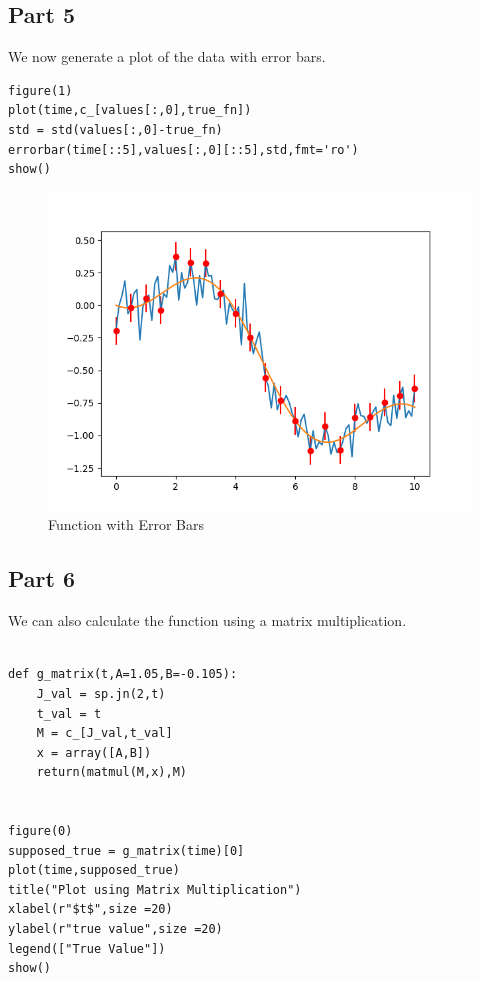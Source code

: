 \documentclass[11pt, a4paper]{article}
\begin{document}
  
 \subsection{Part 5}
 We now generate a plot of the data with error bars.
 \begin{verbatim}
figure(1)
plot(time,c_[values[:,0],true_fn])
std = std(values[:,0]-true_fn)
errorbar(time[::5],values[:,0][::5],std,fmt='ro')
show()
\end{verbatim}

\begin{figure}[!tbh]
   	\centering
   	\includegraphics[scale=0.5]{Assignment_3_Qn5_Modified.png}
   	\caption{Function with Error Bars}
   	\label{fig:errorbars}
   \end{figure}

  
 \subsection{Part 6}
 We can also calculate the function using a matrix multiplication.
 \begin{verbatim}
 
def g_matrix(t,A=1.05,B=-0.105):
	J_val = sp.jn(2,t)
	t_val = t
	M = c_[J_val,t_val]
	x = array([A,B])
	return(matmul(M,x),M)


figure(0)
supposed_true = g_matrix(time)[0]
plot(time,supposed_true)
title("Plot using Matrix Multiplication")
xlabel(r"$t$",size =20)
ylabel(r"true value",size =20)
legend(["True Value"])
show()
\end{verbatim}
\end{document}
